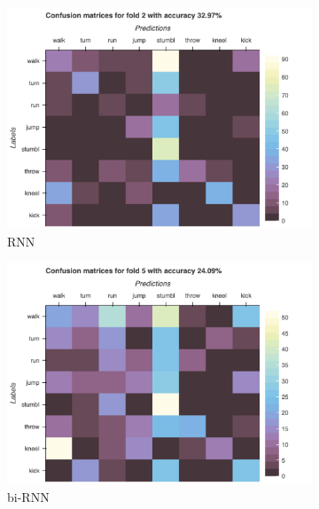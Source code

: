 		\begin{figure}[H]
			\centering
			\begin{subfigure}[b]{0.49\textwidth}
				\centering
				\includegraphics[width=\textwidth]{img/RNN-confusion_matrix.png}
				\caption{RNN}
			\end{subfigure}
			\hfill
			\begin{subfigure}[b]{0.49\textwidth}
				\centering
				\includegraphics[width=\textwidth]{img/bi-RNN-confusion_matrix.png}
				\caption{bi-RNN}
			\end{subfigure}
			\hfill
			\begin{subfigure}[b]{0.49\textwidth}
				\centering

\end{subfigure}
\end{figure}
